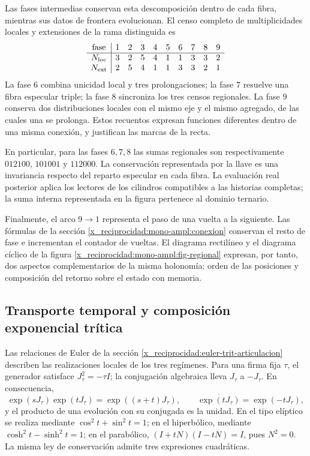Las fases intermedias conservan esta descomposición dentro de cada fibra,
mientras sus datos de frontera evolucionan. El censo completo de
multiplicidades locales y extensiones de la rama distinguida es
\[
\begin{array}{c|rrrrrrrrr}
\text{fase}&1&2&3&4&5&6&7&8&9\\\hline
N_{\rm loc}&3&2&5&4&1&1&3&3&2\\
N_{\rm ext}&2&5&4&1&1&3&3&2&1
\end{array}
\]
La fase \(6\) combina unicidad local y tres prolongaciones; la fase
\(7\) resuelve una fibra especular triple; la fase \(8\) sincroniza
los tres censos regionales. La fase \(9\) conserva dos distribuciones
locales con el mismo eje y el mismo agregado, de las cuales una se
prolonga. Estos recuentos expresan funciones diferentes dentro de una
misma conexión, y justifican las marcas de la recta.

En particular, para las fases \(6,7,8\) las sumas regionales son
respectivamente \(012100\), \(101001\) y \(112000\). La conservación
representada por la llave es una invariancia respecto del reparto
especular en cada fibra. La evaluación real posterior aplica los
lectores de los cilindros compatibles a las historias completas; la
suma interna representada en la figura pertenece al dominio ternario.

Finalmente, el arco \(9\to1\) representa el paso de una vuelta a la
siguiente. Las fórmulas de la sección
\ref{x_reciprocidad:mono-ampl:conexion} conservan el resto de fase e incrementan el
contador de vueltas. El diagrama rectilíneo y el diagrama cíclico de la
figura \ref{x_reciprocidad:mono-ampl:fig-regional} expresan, por tanto, dos aspectos
complementarios de la misma holonomía: orden de las posiciones y
composición del retorno sobre el estado con memoria.



\subsection{Transporte temporal y composición exponencial trítica}
\label{x_reciprocidad:mono-ampl:euler}

Las relaciones de Euler de la sección \ref{x_reciprocidad:euler-trit-articulacion}
describen las realizaciones locales de los tres regímenes. Para una firma
fija \(\tau\), el generador satisface \(J_\tau^2=-\tau I\); la
conjugación algebraica lleva \(J_\tau\) a \(-J_\tau\). En consecuencia,
\[
 \exp(sJ_\tau)\exp(tJ_\tau)=\exp((s+t)J_\tau),\qquad
 \overline{\exp(tJ_\tau)}=\exp(-tJ_\tau),
\]
y el producto de una evolución con su conjugada es la unidad. En el tipo
elíptico se realiza mediante \(\cos^2t+\sin^2t=1\); en el hiperbólico,
mediante \(\cosh^2t-\sinh^2t=1\); en el parabólico,
\((I+tN)(I-tN)=I\), pues \(N^2=0\). La misma ley de conservación
admite tres expresiones cuadráticas.

